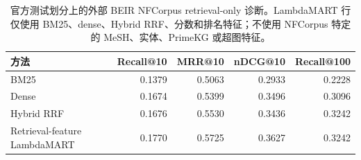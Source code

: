 \begin{table}[t]
\centering
\small
\caption{官方测试划分上的外部 BEIR NFCorpus retrieval-only 诊断。LambdaMART 行仅使用 BM25、dense、Hybrid RRF、分数和排名特征；不使用 NFCorpus 特定的 MeSH、实体、PrimeKG 或超图特征。}
\label{tab:nfcorpus-retrieval-diagnostic}
\begin{tabular}{lrrrr}
\toprule
方法 & Recall@10 & MRR@10 & nDCG@10 & Recall@100 \\
\midrule
BM25 & 0.1379 & 0.5063 & 0.2933 & 0.2228 \\
Dense & 0.1674 & 0.5399 & 0.3496 & 0.3096 \\
Hybrid RRF & 0.1676 & 0.5530 & 0.3436 & 0.3242 \\
Retrieval-feature LambdaMART & 0.1770 & 0.5725 & 0.3627 & 0.3242 \\
\bottomrule
\end{tabular}
\end{table}
